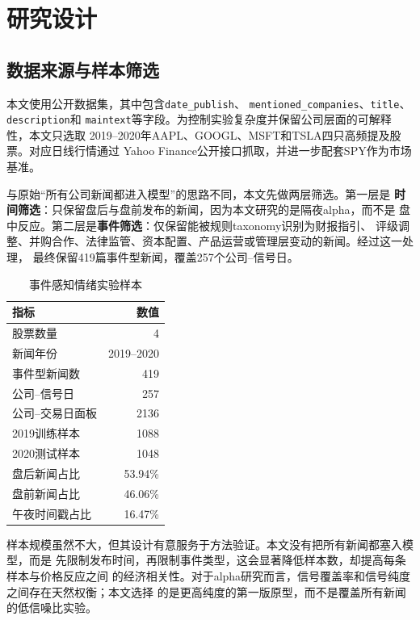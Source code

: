 \documentclass[UTF8,a4paper,10pt,twocolumn,fontset=none]{ctexart}
\begin{document}
\section{研究设计}

\subsection{数据来源与样本筛选}

本文使用公开数据集\cite{luckycat}，其中包含\texttt{date\_publish}、
\texttt{mentioned\_companies}、\texttt{title}、\texttt{description}和
\texttt{maintext}等字段。为控制实验复杂度并保留公司层面的可解释性，本文只选取
2019--2020年AAPL、GOOGL、MSFT和TSLA四只高频提及股票。对应日线行情通过
Yahoo Finance公开接口抓取，并进一步配套SPY作为市场基准。

与原始“所有公司新闻都进入模型”的思路不同，本文先做两层筛选。第一层是
\textbf{时间筛选}：只保留盘后与盘前发布的新闻，因为本文研究的是隔夜alpha，而不是
盘中反应。第二层是\textbf{事件筛选}：仅保留能被规则taxonomy识别为财报指引、
评级调整、并购合作、法律监管、资本配置、产品运营或管理层变动的新闻。经过这一处理，
最终保留419篇事件型新闻，覆盖257个公司--信号日。

\begin{table}[!htbp]
\centering
\caption{事件感知情绪实验样本}
\small
\begin{tabular}{lr}
\toprule
指标 & 数值\\
\midrule
股票数量 & 4\\
新闻年份 & 2019--2020\\
事件型新闻数 & 419\\
公司--信号日 & 257\\
公司--交易日面板 & 2136\\
2019训练样本 & 1088\\
2020测试样本 & 1048\\
盘后新闻占比 & 53.94\%\\
盘前新闻占比 & 46.06\%\\
午夜时间戳占比 & 16.47\%\\
\bottomrule
\end{tabular}
\label{tab:sample}
\end{table}

样本规模虽然不大，但其设计有意服务于方法验证。本文没有把所有新闻都塞入模型，而是
先限制发布时间，再限制事件类型，这会显著降低样本数，却提高每条样本与价格反应之间
的经济相关性。对于alpha研究而言，信号覆盖率和信号纯度之间存在天然权衡；本文选择
的是更高纯度的第一版原型，而不是覆盖所有新闻的低信噪比实验。
\end{document}
